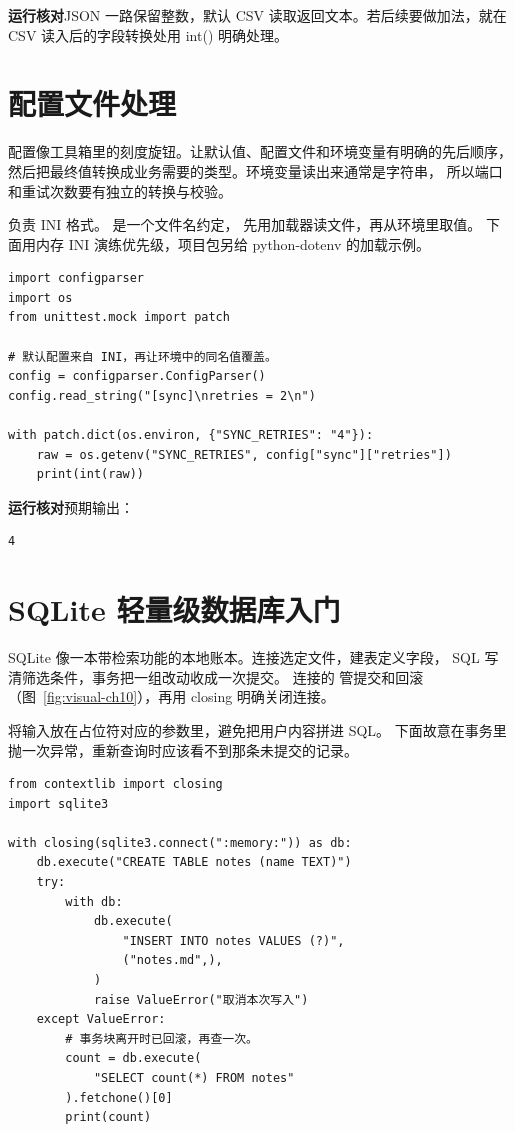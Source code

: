 \textbf{运行核对}\enspace JSON 一路保留整数，默认 CSV 读取返回文本。若后续要做加法，就在 CSV 读入后的字段转换处用 int() 明确处理。

\section{配置文件处理}

配置像工具箱里的刻度旋钮。让默认值、配置文件和环境变量有明确的先后顺序，
然后把最终值转换成业务需要的类型。环境变量读出来通常是字符串，
所以端口和重试次数要有独立的转换与校验。

 负责 INI 格式。 是一个文件名约定，
先用加载器读文件，再从环境里取值。
下面用内存 INI 演练优先级，项目包另给 python-dotenv 的加载示例。


\begin{lstlisting}[title={\code{config_order.py}}]
import configparser
import os
from unittest.mock import patch

# 默认配置来自 INI，再让环境中的同名值覆盖。
config = configparser.ConfigParser()
config.read_string("[sync]\nretries = 2\n")

with patch.dict(os.environ, {"SYNC_RETRIES": "4"}):
    raw = os.getenv("SYNC_RETRIES", config["sync"]["retries"])
    print(int(raw))
\end{lstlisting}


\textbf{运行核对}\enspace 预期输出：
\begin{lstlisting}[language={},numbers=none]
4
\end{lstlisting}

\par


\section{SQLite 轻量级数据库入门}

SQLite 像一本带检索功能的本地账本。连接选定文件，建表定义字段，
SQL 写清筛选条件，事务把一组改动收成一次提交。
连接的  管提交和回滚（图~\ref{fig:visual-ch10}），再用 closing 明确关闭连接。

将输入放在占位符对应的参数里，避免把用户内容拼进 SQL。
下面故意在事务里抛一次异常，重新查询时应该看不到那条未提交的记录。


\begin{lstlisting}[title={\code{rollback_demo.py}}]
from contextlib import closing
import sqlite3

with closing(sqlite3.connect(":memory:")) as db:
    db.execute("CREATE TABLE notes (name TEXT)")
    try:
        with db:
            db.execute(
                "INSERT INTO notes VALUES (?)",
                ("notes.md",),
            )
            raise ValueError("取消本次写入")
    except ValueError:
        # 事务块离开时已回滚，再查一次。
        count = db.execute(
            "SELECT count(*) FROM notes"
        ).fetchone()[0]
        print(count)
\end{lstlisting}


